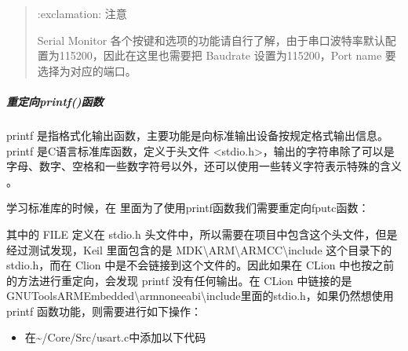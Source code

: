 \documentclass[a4paper,12pt,english]{sphinxmanual}
\begin{document}
\begin{sphinxVerbatim}[commandchars=\\\{\}]
\end{sphinxVerbatim}
\begin{quote}

\sphinxAtStartPar
:exclamation: 注意

\sphinxAtStartPar
Serial Monitor 各个按键和选项的功能请自行了解，由于串口波特率默认配置为115200，因此在这里也需要把 Baudrate 设置为115200，Port name 要选择为对应的端口。

\sphinxAtStartPar
{}
\end{quote}


\subparagraph{重定向printf()函数}
\label{\detokenize{exp-stm32/peripherals-and-sensors:printf}}
\sphinxAtStartPar
printf 是指格式化输出函数，主要功能是向标准输出设备按规定格式输出信息。printf 是C语言标准库函数，定义于头文件 <stdio.h>，输出的字符串除了可以是字母、数字、空格和一些数字符号以外，还可以使用一些转义字符表示特殊的含义 。

\sphinxAtStartPar
学习标准库的时候，在  里面为了使用printf函数我们需要重定向fputc函数：

\begin{sphinxVerbatim}[commandchars=\\\{\}]
\end{sphinxVerbatim}

\sphinxAtStartPar
其中的 FILE 定义在 stdio.h 头文件中，所以需要在项目中包含这个头文件，但是经过测试发现，Keil 里面包含的是 MDK\textbackslash{}ARM\textbackslash{}ARMCC\textbackslash{}include 这个目录下的stdio.h，而在 Clion 中是不会链接到这个文件的。因此如果在 CLion 中也按之前的方法进行重定向，会发现 printf 没有任何输出。在 CLion 中链接的是 GNU\sphinxhyphen{}Tools\sphinxhyphen{}ARM\sphinxhyphen{}Embedded\textbackslash{}arm\sphinxhyphen{}none\sphinxhyphen{}eabi\textbackslash{}include里面的stdio.h，如果仍然想使用 printf 函数功能，则需要进行如下操作：
\begin{itemize}
\item {} 
\sphinxAtStartPar
在\textasciitilde{}/Core/Src/usart.c中添加以下代码

\end{itemize}
\end{document}
